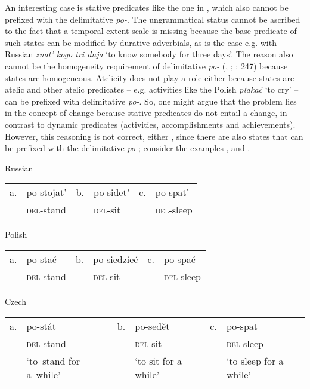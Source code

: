 \documentclass[output=paper,colorlinks,citecolor=brown]{langscibook}
\begin{document}
\largerpage[-1]
An interesting case is stative predicates like the one in , which also cannot be prefixed with the delimitative \textit{po-}. The ungrammatical status cannot be ascribed to the fact that a temporal extent scale is missing because the base predicate of such states can be modified by durative adverbials, as is the case e.g. with Russian \textit{znat' kogo tri dnja} ‘to know somebody for three days’. The reason also cannot be the homogeneity requirement of delimitative \textit{po-} (\citealt[61]{bis:Filip2000}, \citeyear[91]{Filip2003}; \citealt{Mehlig2006}: 247) because states are homogeneous. Atelicity does not play a role either because states are atelic and other atelic predicates – e.g. activities like the Polish \textit{płakać} ‘to cry’ – can be prefixed with delimitative \textit{po-}. So, one might argue that the problem lies in the concept of change because stative predicates do not entail a change, in contrast to dynamic predicates (activities, accomplishments and achievements). However, this reasoning is not correct, either%
, since there are also states that can be prefixed with the delimitative \textit{po-}; consider the examples ,  and . 

\ea Russian\label{biskup:ex:stem-rus2}\\
\begin{tabularx}{.95\textwidth}{l@{~~}X@{~~}l@{~~}X@{~~}l@{~~}X}
     a.&po-stojat'&b.&po-sidet'&c.&po-spat'\\
     & \textsc{del}-stand&&\textsc{del}-sit&&\textsc{del}-sleep\\
\end{tabularx}
\z

\ea Polish\label{biskup:ex:stem-pol2}\\
\begin{tabularx}{.95\textwidth}{l@{~~}X@{~~}l@{~~}X@{~~}l@{~~}X}
     a.&po-stać&b.&po-siedzieć&c.&po-spać\\
     & \textsc{del}-stand&&\textsc{del}-sit&&\textsc{del}-sleep\\
\end{tabularx}
\z

\ea Czech\label{biskup:ex:stem-cz2}\\
\begin{tabularx}{.95\textwidth}{l@{~~}X@{~~}l@{~~}X@{~~}l@{~~}X}
     a.&po-stát&b.&po-sedět&c.&po-spat\\
     & \textsc{del}-stand&&\textsc{del}-sit&&\textsc{del}-sleep\\
     &‘to~stand for a~while’&&`to sit for a while'&&`to sleep for a while'\\
\end{tabularx}
\z
\end{document}
